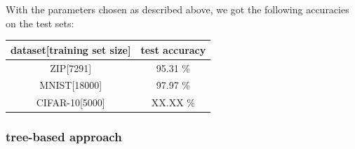 With the parameters chosen as described above, we got the following accuracies on the test sets:\\

\begin{tabular}{|c|c|}
 \hline
 dataset[training set size] & test accuracy \\ \hline
 ZIP[7291] & 95.31 \% \\
 MNIST[18000] & 97.97 \% \\
 CIFAR-10[5000] & XX.XX \% \\
 \hline
\end{tabular}


\subsubsection{tree-based approach}